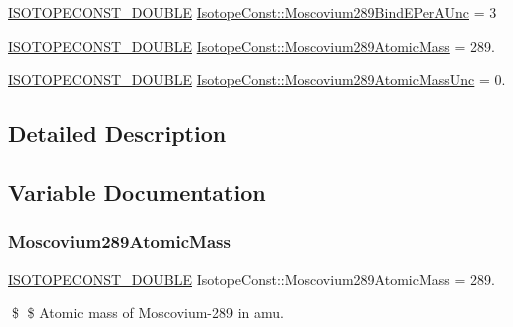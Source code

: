 \begin{DoxyCompactItemize}
\mbox{\hyperlink{group___isotope_const-_macros_ga8f45a7272ce02c0b4c65c44636ed719a}{I\+S\+O\+T\+O\+P\+E\+C\+O\+N\+S\+T\+\_\+\+D\+O\+U\+B\+LE}} \mbox{\hyperlink{group___isotope_const-_moscovium-_mc289_ga34da71aa6c8101acf7bc2b36bb1361e2}{Isotope\+Const\+::\+Moscovium289\+Bind\+E\+Per\+A\+Unc}} = 3
\item 
\mbox{\hyperlink{group___isotope_const-_macros_ga8f45a7272ce02c0b4c65c44636ed719a}{I\+S\+O\+T\+O\+P\+E\+C\+O\+N\+S\+T\+\_\+\+D\+O\+U\+B\+LE}} \mbox{\hyperlink{group___isotope_const-_moscovium-_mc289_ga5d202317334a865ffa7be2ee53a9bc12}{Isotope\+Const\+::\+Moscovium289\+Atomic\+Mass}} = 289.
\item 
\mbox{\hyperlink{group___isotope_const-_macros_ga8f45a7272ce02c0b4c65c44636ed719a}{I\+S\+O\+T\+O\+P\+E\+C\+O\+N\+S\+T\+\_\+\+D\+O\+U\+B\+LE}} \mbox{\hyperlink{group___isotope_const-_moscovium-_mc289_ga3c1eab3d85d3cdf5c703903c6934ccd7}{Isotope\+Const\+::\+Moscovium289\+Atomic\+Mass\+Unc}} = 0.
\end{DoxyCompactItemize}


\subsection{Detailed Description}


\subsection{Variable Documentation}
\mbox{\label{group___isotope_const-_moscovium-_mc289_ga5d202317334a865ffa7be2ee53a9bc12}} 
\subsubsection{\texorpdfstring{Moscovium289\+Atomic\+Mass}{Moscovium289AtomicMass}}
{\footnotesize\ttfamily \mbox{\hyperlink{group___isotope_const-_macros_ga8f45a7272ce02c0b4c65c44636ed719a}{I\+S\+O\+T\+O\+P\+E\+C\+O\+N\+S\+T\+\_\+\+D\+O\+U\+B\+LE}} Isotope\+Const\+::\+Moscovium289\+Atomic\+Mass = 289.}

\$ \$ Atomic mass of Moscovium-\/289 in amu. \mbox{\label{group___isotope_const-_moscovium-_mc289_ga3c1eab3d85d3cdf5c703903c6934ccd7}} 
